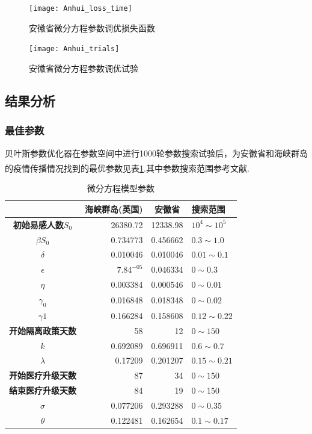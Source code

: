 \documentclass{whutmod}
\newcommand{\upcite}[1]{\textsuperscript{\textsuperscript{\cite{#1}}}}
\begin{document}
	\begin{figure}[!h]
		\begin{minipage}[t]{0.4\textwidth}
		\centering
		\texttt{[image: Anhui\_loss\_time]}
		\caption{安徽省微分方程参数调优损失函数}
		\label{fig:Anhui_loss_time}
		\end{minipage}
		\begin{minipage}[t]{0.6\textwidth}
		\centering
		\texttt{[image: Anhui\_trials]}
		\caption{安徽省微分方程参数调优试验}
		\label{fig:Anhui_trials}
		\end{minipage}
	\end{figure}
	\begin{figure}[!h]
	\end{figure}
  
\subsection{结果分析}
	\subsubsection{最佳参数}
	贝叶斯参数优化器在参数空间中进行1000轮参数搜索试验后，为安徽省和海峡群岛的疫情传播情况找到的最优参数见表\ref{tab:parameters}.其中参数搜索范围参考文献\upcite{bib:two}.
	\begin{table}[htbp]
		\centering
		\caption{微分方程模型参数}
		\begin{tabular}{crrl}
		\toprule
				& \multicolumn{1}{c}{\textbf{海峡群岛(英国)}} & \multicolumn{1}{c}{\textbf{安徽省}} & 搜索范围 \\
		\midrule
		\textbf{初始易感人数$S_0$} & 26380.72 & 12338.98 & $10^4 \sim 10^5$ \\
		\textbf{$\beta S_0$} & 0.734773 & 0.456662 & $0.3\sim1.0$ \\
		\textbf{$\delta$} & 0.010046 & 0.010046 & $0.01\sim0.1$ \\
		\textbf{$\epsilon$} & $7.84^{-05}$ & 0.046334 & $0\sim0.3$ \\
		\textbf{$\eta$} & 0.003384 & 0.000546 & $0\sim0.01$ \\
		\textbf{$\gamma_0$} & 0.016848 & 0.018348 & $0\sim0.02$ \\
		\textbf{$\gamma1$} & 0.166284 & 0.158608 & $0.12\sim0.22$ \\
		\textbf{开始隔离政策天数} & 58    & 12    & $0\sim 150$ \\
		\textbf{$k$} & 0.692089 & 0.696911 & $0.6\sim0.7$ \\
		\textbf{$\lambda$} & 0.17209 & 0.201207 & $0.15\sim0.21$ \\
		\textbf{开始医疗升级天数} & 87    & 34    & $0\sim 150$ \\
		\textbf{结束医疗升级天数} & 84    & 19    & $0\sim 150$ \\
		\textbf{$\sigma$} & 0.077206 & 0.293288 & $0\sim0.35$ \\
		\textbf{$\theta$} & 0.122481 & 0.162654 & $0.1\sim0.17$ \\
		\bottomrule
		\end{tabular}%
		\label{tab:parameters}%
	\end{table}%
	\newpage
\end{document}
